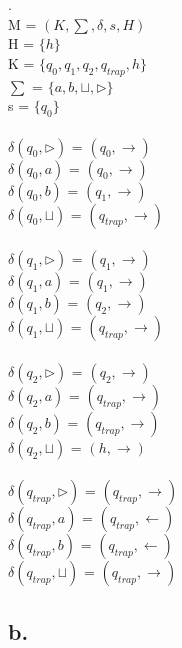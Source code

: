 \documentclass[12pt]{article}
\begin{document}
.\\
M = $(K, \sum, \delta, s, H)$\\
H = $\{ h \}$\\
K = $\{ q_0 , q_1 , q_2 , q_{trap}, h \}$\\
$\sum$ = $\{ a, b, \sqcup , \triangleright \}$\\
s = $\{ q_0 \}$\\
\\
$\delta (q_0 , \triangleright )$ = $(q_0 , \rightarrow)$\\
$\delta (q_0 , a )$ = $(q_0 , \rightarrow)$\\
$\delta (q_0 , b )$ = $(q_1 , \rightarrow)$\\
$\delta (q_0 , \sqcup )$ = $(q_{trap} , \rightarrow)$\\
\\
$\delta (q_1 , \triangleright )$ = $(q_1 , \rightarrow)$\\
$\delta (q_1 , a )$ = $(q_1 , \rightarrow)$\\
$\delta (q_1 , b )$ = $(q_2 , \rightarrow)$\\
$\delta (q_1 , \sqcup )$ = $(q_{trap} , \rightarrow)$\\
\\
$\delta (q_2 , \triangleright )$ = $(q_2 , \rightarrow)$\\
$\delta (q_2 , a )$ = $(q_{trap} , \rightarrow)$\\
$\delta (q_2 , b )$ = $(q_{trap} , \rightarrow)$\\
$\delta (q_2 , \sqcup )$ = $(h , \rightarrow)$\\
\\
$\delta (q_{trap} , \triangleright )$ = $(q_{trap} , \rightarrow)$\\
$\delta (q_{trap} , a )$ = $(q_{trap} , \leftarrow)$\\
$\delta (q_{trap} , b )$ = $(q_{trap} , \leftarrow)$\\
$\delta (q_{trap} , \sqcup )$ = $(q_{trap} , \rightarrow)$\\

\subsection*{b.} 
\end{document}
